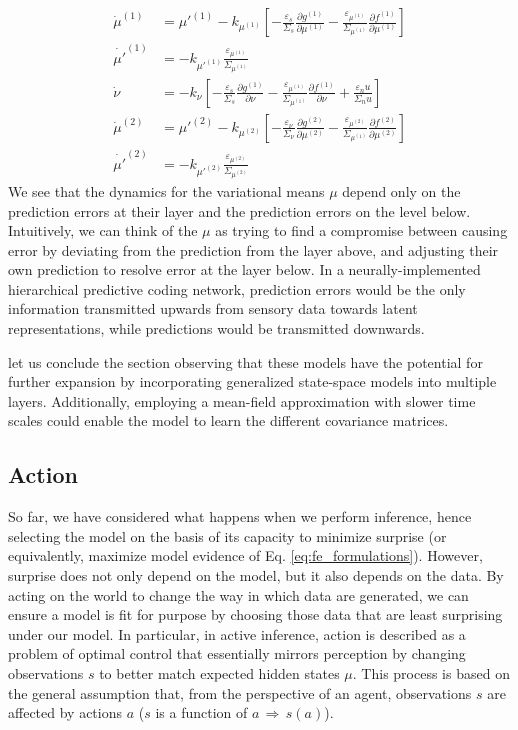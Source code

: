 \documentclass[10pt]{article}
\begin{document}
\begin{equation}
\begin{split}
    \dot{\mu}^{(1)} &= \mu'^{(1)} - k_{\mu^{(1)}} \left[ -\frac{\varepsilon_s}{\Sigma_s}\frac{\partial g^{(1)}}{\partial \mu^{(1)}} - \frac{\varepsilon_{\mu^{(1)}}}{\Sigma_{\mu^{(1)}}} \frac{\partial f^{(1)}}{\partial \mu^{(1)}}\right] \\
    \dot{\mu'}^{(1)} &= -k_{{\mu'}^{(1)}} \frac{\varepsilon_{\mu^{(1)}}}{\Sigma_{\mu^{(1)}}} \\
    \dot{\nu} &= -k_\nu \left[ -\frac{\varepsilon_s}{\Sigma_s}\frac{\partial g^{(1)}}{\partial \nu} - \frac{\varepsilon_{\mu^{(1)}}}{\Sigma_{\mu^{(1)}}} \frac{\partial f^{(1)}}{\partial \nu} + \frac{\varepsilon_nu}{\Sigma_nu} \right] \\
    \dot{\mu}^{(2)} &= \mu'^{(2)} - k_{\mu^{(2)}} \left[ -\frac{\varepsilon_\nu}{\Sigma_\nu}\frac{\partial g^{(2)}}{\partial \mu^{(2)}} - \frac{\varepsilon_{\mu^{(2)}}}{\Sigma_{\mu^{(1)}}} \frac{\partial f^{(2)}}{\partial \mu^{(2)}} \right] \\
    \dot{\mu'}^{(2)} &= -k_{{\mu'}^{(2)}} \frac{\varepsilon_{\mu^{(2)}}}{\Sigma_{\mu^{(2)}}} 
\end{split}
\end{equation}
We see that the dynamics for the variational means $\mu$ depend only on the prediction errors at their layer and the prediction errors on the level below. Intuitively, we can think of the $\mu$ as trying to find a compromise between causing error by deviating from the prediction from the layer above, and adjusting their own prediction to resolve error at
the layer below. In a neurally-implemented hierarchical predictive coding network, prediction errors would be the only information transmitted upwards from sensory data towards latent representations, while  predictions would be transmitted downwards. 

let us conclude the section observing that these models have the potential for further expansion by incorporating generalized state-space models into multiple layers. Additionally, employing a mean-field approximation with slower time scales could enable the model to learn the different covariance matrices.

\subsection{Action}
\label{sec:action}
So far, we have considered what happens when we perform inference, hence selecting the model on the basis of its capacity to minimize surprise (or equivalently, maximize model evidence of Eq. \ref{eq:fe_formulations}). However, surprise does not only depend on the model, but it also depends on the data. By acting on the world to change the way in which data are generated, we can ensure a model is fit for purpose by choosing those data that are least surprising under our model.
In particular, in active inference, action is described as a problem of optimal control that essentially mirrors perception by changing observations $s$ to better match expected hidden states $\mu$. This process is based on the general assumption that, from the perspective of an agent, observations $s$ are affected by actions $a$ ($s$ is a function of $a \, \Rightarrow \, s(a)$).
\end{document}
